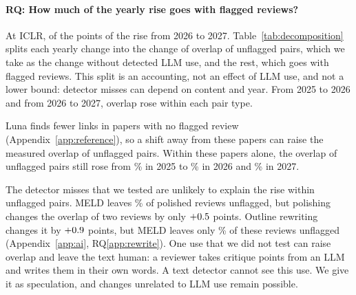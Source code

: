 \documentclass[11pt]{article}
\newcounter{rq}
\newcommand{\question}[2]{\refstepcounter{rq}\paragraph{RQ\therq: #2}\label{#1}}
\begin{document}
\begin{table}[!htp]
\centering\small
\setlength{\tabcolsep}{4pt}

\caption{Outline rewriting raises the overlap of two changed ICLR reviews less than the flagged-pair gap, and polishing does not clearly raise it. Each paper gives one pair with both reviews changed. Before and After: mean overlap (\%) of these pairs. Alone: their change when Luna groups only these two reviews. Pairs: all pairs of these papers, before and after; the fixed-effects fit uses them, controls for pairs with one changed review and for the second grouping, and clusters SEs by paper. Kimi covers ICLR only.}
\label{tab:rewrite}
\end{table}


\question{app:decomposition}{How much of the yearly rise goes with flagged reviews?}
At ICLR, \DecSnapLlm{} of the \DecSnapChange{} points of the rise from 2026 to 2027. Table~\ref{tab:decomposition} splits each yearly change into the change of overlap of unflagged pairs, which we take as the change without detected LLM use, and the rest, which goes with flagged reviews. This split is an accounting, not an effect of LLM use, and not a lower bound: detector misses can depend on content and year. From 2025 to 2026 and from 2026 to 2027, overlap rose within each pair type.

Luna finds fewer links in papers with no flagged review (Appendix~\ref{app:reference}), so a shift away from these papers can raise the measured overlap of unflagged pairs. Within these papers alone, the overlap of unflagged pairs still rose from \DecIclrCleanBase\% in 2025 to \DecIclrCleanLast\% in 2026 and \DecSnapCleanLast\% in 2027.

The detector misses that we tested are unlikely to explain the rise within unflagged pairs. MELD leaves \PolishUnflagged\% of polished reviews unflagged, but polishing changes the overlap of two reviews by only $+0.5$ points. Outline rewriting changes it by $+0.9$ points, but MELD leaves only \RewriteUnflagged\% of these reviews unflagged (Appendix~\ref{app:ai}, RQ\ref{app:rewrite}). One use that we did not test can raise overlap and leave the text human: a reviewer takes critique points from an LLM and writes them in their own words. A text detector cannot see this use. We give it as speculation, and changes unrelated to LLM use remain possible.

\begin{table}[!htp]
\centering\footnotesize
\setlength{\tabcolsep}{3.5pt}

\caption{Part of each yearly rise goes with flagged reviews, and overlap also rose within unflagged pairs. Pair types count the LLM-flagged reviews of a pair: none, one or two. None, no flag in paper: unflagged pairs of papers with no flagged review. Unflagged pairs: change of the overlap of pairs with no flagged review. With flagged reviews: the rest of the total change. Papers have equal weight. The ICLR rows of 2026 and 2027 use reviews taken during the discussion phase.}
\label{tab:decomposition}
\end{table}
\end{document}
